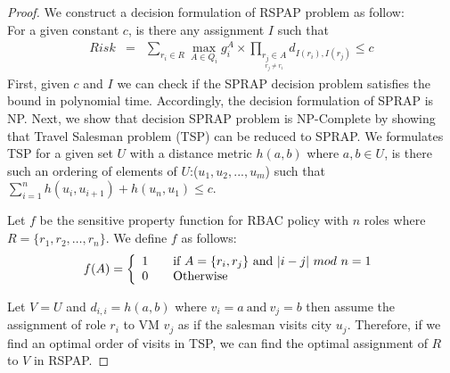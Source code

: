 \begin{proof}
We construct a decision  formulation of RSPAP problem as follow:\\
For a given constant $c$, is there any assignment  $I$ such that 
\begin{eqnarray*}
Risk&=&\sum_{r_i \in R}  \max_{A \in Q_i} g_{i}^{A} \times \prod_{\underset{r_j \neq r_i}{r_j \in A}} d_{I(r_i),I(r_j)}   \le c
\end{eqnarray*}
First, given $c$ and $I$ we can check if the SPRAP decision problem satisfies the bound in polynomial time. Accordingly, the decision formulation of SPRAP is NP. Next, we show that decision SPRAP problem is NP-Complete by showing that  Travel Salesman problem (TSP) can be reduced to SPRAP. We formulates TSP for a given set $U$ with a distance metric $h(a,b)$ where $a,b \in U$, is there such an ordering of elements of $U$:($u_1,u_2,...,u_m$) such that $\sum_{i=1}^n h(u_i,u_{i+1})+h(u_n,u_1) \leq c$.

Let  $f$ be the sensitive property function for  RBAC policy with $n$ roles where $R= \lbrace r_1,r_2, \dots , r_n \rbrace$.  We define $f$ as follows:
\[ f(A) = \left  \{
  \begin{array}{l l}
    1 & \quad  \text{if} \ A = \lbrace r_i, r_j \rbrace\ \text{and} \ |i-j| \ mod \ n = 1\\
    0 & \quad \text{Otherwise}
\end{array} \right.\]

Let  $V = U$  and $d_{i,i} = h(a,b)$ where $v_i= a \ \text{and} \ v_j = b$ then assume the assignment of role $r_i$ to VM $v_j$ as if the salesman visits city $u_j$. Therefore, if we find an optimal order of visits in TSP, we can find the optimal assignment of $R$  to $V$ in RSPAP.
\end{proof} 

